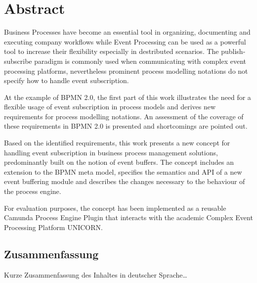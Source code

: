 \begingroup
\let\clearpage\relax
\let\cleardoublepage\relax
\let\cleardoublepage\relax

\chapter*{Abstract}
Business Processes have become an essential tool in organizing, documenting and executing company workflows while Event Processing can be used as a powerful tool to increase their flexibility especially in destributed scenarios. 
The publish-subscribe paradigm is commonly used when communicating with complex event processing platforms, nevertheless prominent process modelling notations do not specify how to handle event subscription.

At the example of BPMN 2.0, the first part of this work illustrates the need for a flexible usage of event subscription in process models and derives new requirements for process modelling notations. An assessment of the coverage of these requirements in BPMN 2.0 is presented and shortcomings are pointed out.

Based on the identified requirements, this work presents a new concept for handling event subscription in business process management solutions, predominantly built on the notion of event buffers. The concept includes an extension to the BPMN meta model, specifies the semantics and API of a new event buffering module and describes the changes necessary to the behaviour of the process engine.

For evaluation purposes, the concept has been implemented as a reusable Camunda Process Engine Plugin that interacts with the academic Complex Event Processing Platform UNICORN.


\vfill

\begin{otherlanguage}{ngerman}
\chapter*{Zusammenfassung}
Kurze Zusammenfassung des Inhaltes in deutscher Sprache\dots 
\end{otherlanguage}

\endgroup			

\vfill